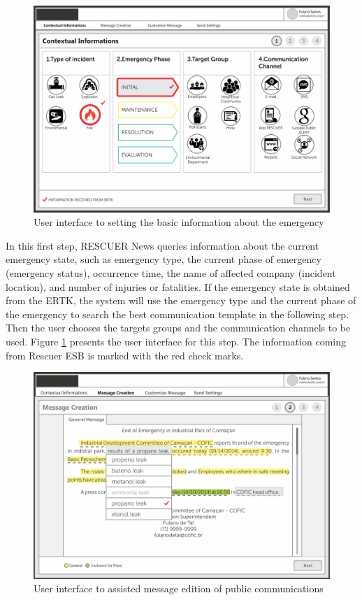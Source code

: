 \begin{figure}[h]
\centering
\includegraphics[width=\linewidth]{images/step1.png}
\caption{User interface to setting the basic information about the emergency}
\label{fig:step1}
\end{figure}

In this first step, RESCUER News queries information about the current emergency state, such as emergency type, the current phase of emergency (emergency status), occurrence time, the name of affected company (incident location), and number of injuries or fatalities. If the emergency state is obtained from the ERTK, the system will use the emergency type and the current phase of the emergency to search the best communication template in the following step.
Then the user chooses the targets groups and the communication channels to be used. Figure \ref{fig:step1} presents the user interface for this step. The information coming from Rescuer ESB is marked with the red check marks.


\begin{figure}
\centering
\includegraphics[width=\linewidth]{images/step2.png}
\caption{User interface to assisted message edition of public communications}
\label{fig:step2}
\end{figure}

